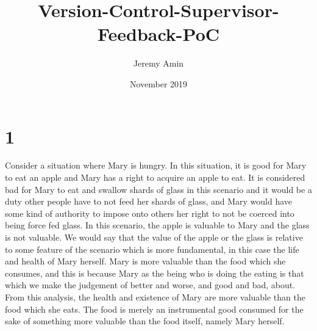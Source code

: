 \documentclass{article}
\title{Version-Control-Supervisor-Feedback-PoC}
\author{Jeremy Amin}
\date{November 2019}
\begin{document}
\maketitle
\tableofcontents

\pagebreak

\section{1}

Consider a situation where Mary is hungry. In this situation, it is good for Mary to eat an apple and Mary has a right to acquire an apple to eat. It is considered bad for Mary to eat and swallow shards of glass in this scenario and it would be a duty other people have to not feed her shards of glass, and Mary would have some kind of authority to impose onto others her right to not be coerced into being force fed glass. In this scenario, the apple is valuable to Mary and the glass is not valuable. We would say that the value of the apple or the glass is relative to some feature of the scenario which is more fundamental, in this case the life and health of Mary herself. Mary is more valuable than the food which she consumes, and this is because Mary as the being who is doing the eating is that which we make the judgement of better and worse, and good and bad, about. From this analysis, the health and existence of Mary are more valuable than the food which she eats. The food is merely an instrumental good consumed for the sake of something more valuable than the food itself, namely Mary herself.
\end{document}
